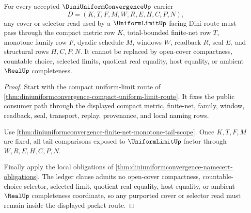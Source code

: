 \begin{theorem}\label{thm:diniuniformconvergence-cover-selector-nonescape}
For every accepted $\DiniUniformConvergenceUp$ carrier
$$
D=(K,T,F,M,W,R,E,H,C,P,N),
$$
any cover or selector read used by a $\UniformLimitUp$-facing Dini route must pass through the compact metric row $K$, total-bounded finite-net row $T$, monotone family row $F$, dyadic schedule $M$, windows $W$, readback $R$, seal $E$, and structural rows $H,C,P,N$. It cannot be replaced by open-cover compactness, countable choice, selected limits, quotient real equality, host equality, or ambient $\RealUp$ completeness.
\end{theorem}
\begin{proof}
Start with the compact uniform-limit route of \autoref{thm:diniuniformconvergence-compact-uniform-limit-route}. It fixes the public consumer path through the displayed compact metric, finite-net, family, window, readback, seal, transport, replay, provenance, and local naming rows.

Use \autoref{thm:diniuniformconvergence-finite-net-monotone-tail-scope}. Once $K,T,F,M$ are fixed, all tail comparisons exposed to $\UniformLimitUp$ factor through $W,R,E,H,C,P,N$.

Finally apply the local obligations of \autoref{thm:diniuniformconvergence-namecert-obligations}. The ledger clause admits no open-cover compactness, countable-choice selector, selected limit, quotient real equality, host equality, or ambient $\RealUp$ completeness coordinate, so any purported cover or selector read must remain inside the displayed packet route.
\end{proof}



